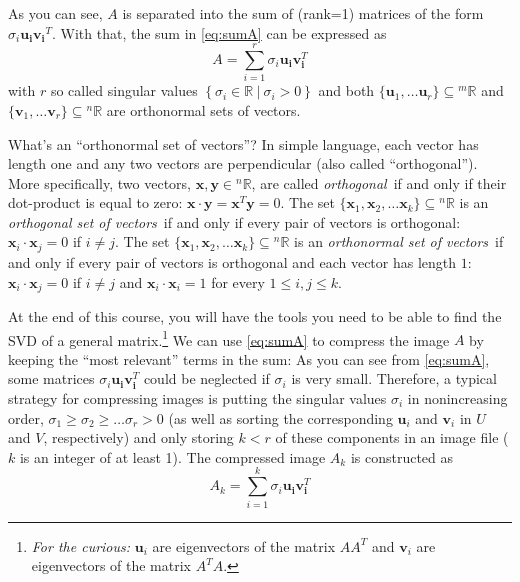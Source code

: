 \documentclass[10pt,addpoints]{exam} %
\newcommand{\mblue}[1]{\color{blue}\textit{#1}\color{black}}
\newcommand{\nR}{{}^{n}\mathbb{R}}
\newcommand{\mR}{{}^{m}\mathbb{R}}
\begin{document}
\begin{questions}
    
    As you can see, $A$ is separated into the sum of (rank=1) matrices of the
    form $\sigma_i \mathbf{u}_{\mathbf{i}}\mathbf{v}_{\mathbf{i}}{ }^T$. With
    that, the sum in \cref{eq:sumA} can be expressed as
    \begin{equation}
      \label{eq:2}
      A=\sum_{i=1}^r \sigma_i \mathbf{u}_{\mathbf{i}} \mathbf{v}_{\mathbf{i}}^T
    \end{equation}
    with $r$ so called singular values
    $\left\{\sigma_i \in \mathbb{R}~|~\sigma_i > 0\right\}$ and
    both $\{ \mathbf{u}_1, \dots \mathbf{u}_r \} \subseteq \mR$ and 
    $\{ \mathbf{v}_1, \dots \mathbf{v}_r \} \subseteq \nR$ are orthonormal sets of vectors.
    
    What's an ``orthonormal set of vectors''?  In simple language, each vector has length one and
    any two vectors are perpendicular (also called ``orthogonal'').  More specifically, two vectors,
    $\mathbf{x}, \mathbf{y} \in \nR$, are called \mblue{orthogonal}\ if and only if their
    dot-product is equal to zero: $\mathbf{x} \cdot \mathbf{y} = \mathbf{x}^T\mathbf{y} = 0$.  The
    set $\{\mathbf{x}_1,\mathbf{x}_2,\dots \mathbf{x}_k\} \subseteq \nR$ is an \mblue{orthogonal set
      of vectors}\ if and only if every pair of vectors is orthogonal:
    $\mathbf{x}_i \cdot \mathbf{x}_j = 0 $ if $i \neq j$.  The set
    $\{\mathbf{x}_1,\mathbf{x}_2,\dots \mathbf{x}_k\} \subseteq \nR$ is an \mblue{orthonormal set of
      vectors}\ if and only if every pair of vectors is orthogonal and each vector has length $1$:
    $\mathbf{x}_i \cdot \mathbf{x}_j = 0 $ if $i \neq j$ and $\mathbf{x}_i \cdot \mathbf{x}_i = 1$
    for every $1 \leq i, j \leq k$.
      
    At the end of this course, you will have the tools you need to be able to find the SVD of a
    general matrix.\footnote{\textit{For the curious:} $\mathbf{u}_i$ are eigenvectors of the matrix
      $AA^T$ and $\mathbf{v}_i$ are eigenvectors of the matrix $A^TA$.}  We can use \cref{eq:sumA}
    to compress the image $A$ by keeping the ``most relevant'' terms in the sum: As you can see from
    \cref{eq:sumA}, some matrices $\sigma_i \mathbf{u}_{\mathbf{i}} \mathbf{v}_{\mathbf{i}}^T$ could
    be neglected if $\sigma_i$ is very small. Therefore, a typical strategy for compressing images
    is putting the singular values $\sigma_i$ in nonincreasing order,
    $\sigma_1 \geq \sigma_2 \geq \dots \sigma_r > 0$ (as well as sorting the corresponding
    $\mathbf{u}_i$ and $\mathbf{v}_i$ in $U$ and $V$, respectively) and only storing $k < r$ of
    these components in an image file ($k$ is an integer of at least 1). The compressed image $A_k$
    is constructed as
  \begin{equation}
    \label{eq:3}
    A_k=\sum_{i=1}^k \sigma_i \mathbf{u}_{\mathbf{i}} \mathbf{v}_{\mathbf{i}}^T
  \end{equation}
  

\end{questions}
\end{document}
